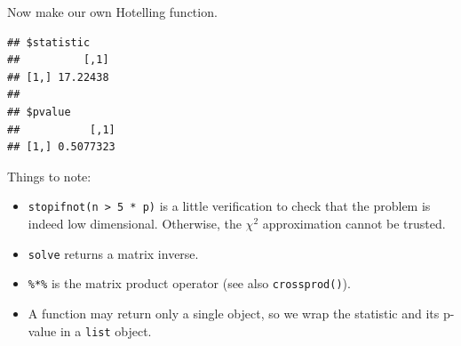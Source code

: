 \documentclass[]{book}
\newenvironment{Shaded}{\begin{snugshade}}{\end{snugshade}}
\newcommand{\KeywordTok}[1]{\textcolor[rgb]{0.13,0.29,0.53}{\textbf{#1}}}
\newcommand{\DataTypeTok}[1]{\textcolor[rgb]{0.13,0.29,0.53}{#1}}
\newcommand{\DecValTok}[1]{\textcolor[rgb]{0.00,0.00,0.81}{#1}}
\newcommand{\StringTok}[1]{\textcolor[rgb]{0.31,0.60,0.02}{#1}}
\newcommand{\OtherTok}[1]{\textcolor[rgb]{0.56,0.35,0.01}{#1}}
\newcommand{\ControlFlowTok}[1]{\textcolor[rgb]{0.13,0.29,0.53}{\textbf{#1}}}
\newcommand{\OperatorTok}[1]{\textcolor[rgb]{0.81,0.36,0.00}{\textbf{#1}}}
\newcommand{\NormalTok}[1]{#1}
\providecommand{\tightlist}{%
  \setlength{\itemsep}{0pt}\setlength{\parskip}{0pt}}
\theoremstyle{definition}
\theoremstyle{definition}
\theoremstyle{definition}
\theoremstyle{remark}
\begin{document}
Now make our own Hotelling function.

\begin{Shaded}
\end{Shaded}

\begin{verbatim}
## $statistic
##          [,1]
## [1,] 17.22438
## 
## $pvalue
##           [,1]
## [1,] 0.5077323
\end{verbatim}

Things to note:

\begin{itemize}
\tightlist
\item
  \texttt{stopifnot(n\ \textgreater{}\ 5\ *\ p)} is a little
  verification to check that the problem is indeed low dimensional.
  Otherwise, the \(\chi^2\) approximation cannot be trusted.
\item
  \texttt{solve} returns a matrix inverse.
\item
  \texttt{\%*\%} is the matrix product operator (see also
  \texttt{crossprod()}).
\item
  A function may return only a single object, so we wrap the statistic
  and its p-value in a \texttt{list} object.
\end{itemize}
\end{document}
